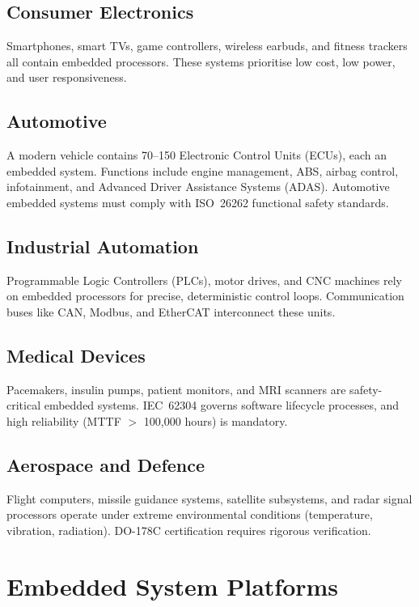 \subsection{Consumer Electronics}
Smartphones, smart TVs, game controllers, wireless earbuds, and fitness trackers all contain embedded processors. These systems prioritise low cost, low power, and user responsiveness.

\subsection{Automotive}
A modern vehicle contains 70--150 Electronic Control Units (ECUs), each an embedded system. Functions include engine management, ABS, airbag control, infotainment, and Advanced Driver Assistance Systems (ADAS). Automotive embedded systems must comply with ISO~26262 functional safety standards.

\subsection{Industrial Automation}
Programmable Logic Controllers (PLCs), motor drives, and CNC machines rely on embedded processors for precise, deterministic control loops. Communication buses like CAN, Modbus, and EtherCAT interconnect these units.

\subsection{Medical Devices}
Pacemakers, insulin pumps, patient monitors, and MRI scanners are safety-critical embedded systems. IEC~62304 governs software lifecycle processes, and high reliability (MTTF $>$ 100{,}000 hours) is mandatory.

\subsection{Aerospace and Defence}
Flight computers, missile guidance systems, satellite subsystems, and radar signal processors operate under extreme environmental conditions (temperature, vibration, radiation). DO-178C certification requires rigorous verification.

\section{Embedded System Platforms}
\label{sec:intro:platforms}


